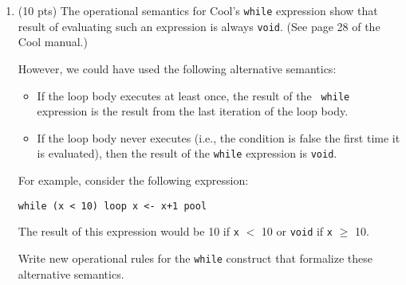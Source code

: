 \documentclass[10pt]{article}
\newcommand{\ttmath}[1]{$\mathtt{#1}$}
\newcommand{\ossimple}[6]{#1,#2,#3\vdash #4 : #5,#6}
\newcommand{\deduct}[3]{\frac{#1}{#2}\eqno\mbox{#3}}
\begin{document}
\begin{enumerate}
\texttt{a[\ttmath{e_1}] \ttmath{\leftarrow e_2}} \\
$$
\deduct{
	\begin{array}{l}
		\ossimple{so}{S_1}{E}{e_2}{v}{S_2}	\\
		E(a[e_1]) = l_a 					\\
		S = S_1[v/l_a]						\\
	\end{array}
}{
	\ossimple{so}{S_1}{E}{\texttt{a[\ttmath{e_1}] \ttmath{\leftarrow e_2}} } {v}{S} \\
}{
	[Assign-Array]
}
$$
\texttt{a[e]} \\
$$\deduct{
	\begin{array}{l}
		E(a[e]) = l_a 	\\
		S(l_a) = v 		\\
	\end{array}	
}{
	\ossimple{so}{S_1}{E}{\texttt{a[e]}}{v}{S} \\	
}{
	[Reference-Array]
}$$

\pagebreak

\item (10 pts)
The operational semantics for Cool's {\tt while} expression show that
result of evaluating such an expression is always {\tt void}.  (See page
28 of the Cool manual.)

However, we could have used the following alternative semantics:

\begin{itemize}

\item If the loop body executes at least once, the result of the {\tt
while} expression is the result from the last iteration of the loop body.

\item If the loop body never executes (i.e., the condition is false the
first time it is evaluated), then the result of the {\tt while} expression
is {\tt void}.

\end{itemize}

For example, consider the following expression:

\begin{center}
{\tt while (x < 10) loop x <- x+1 pool}
\end{center}

The result of this expression would be 10 if {\tt x} $<$ 10 or {\tt void}
if {\tt x} $\geq$ 10.

Write new operational rules for the {\tt while} construct that formalize
these alternative semantics.


\end{enumerate}
\end{document}
